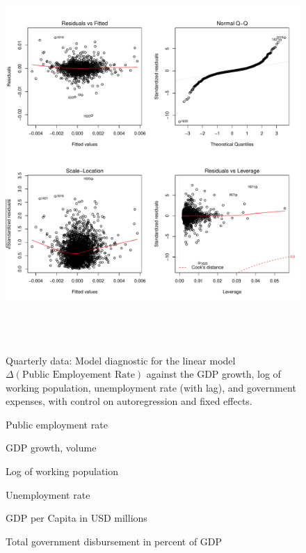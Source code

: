 \documentclass[a4paper, 10pt]{article}
\newcommand{\insertplot}[2]{
  \begin{figure}[!ht]
    \centering
    
    \caption{#2}
  \end{figure}
}
\begin{document}
\begin{landscape}
  \begin{figure}
    \centering
    \includegraphics[height=15cm]{model_diagnostic_quarterly}
    \caption{Quarterly data: Model diagnostic for the linear model $\Delta( \textrm{Public
        Employement Rate})$ against the GDP growth, log of working
      population, unemployment rate (with lag), and government expenses, with
      control on autoregression and fixed effects.}
   \end{figure}

  \insertplot{simple_model_quarterly_egr.tex}{Public employment rate}
  \insertplot{simple_model_quarterly_gdpv_annpct.tex}{GDP growth, volume}
  \insertplot{simple_model_quarterly_lpop_interpolated.tex}{Log of working population}
  \insertplot{simple_model_quarterly_unr.tex}{Unemployment rate}
  \insertplot{simple_model_quarterly_gdp_per_capita_interpolated.tex}{GDP per
    Capita in USD millions}
  \insertplot{simple_model_quarterly_ypgtq_interpolated.tex}{Total government disbursement in
    percent of GDP}
\end{landscape}
\end{document}
